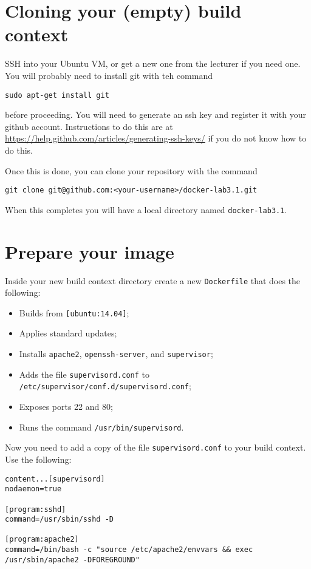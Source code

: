 \documentclass{article}
\begin{document}
\section{Cloning your (empty) build context}
SSH into your Ubuntu VM, or get a new one from the lecturer if you need one.  You will probably need to install git with teh command

\texttt{sudo apt-get install git}

before proceeding.  You will need to generate an ssh key and register it with your github account.  Instructions to do this are at \url{https://help.github.com/articles/generating-ssh-keys/} if you do not know how to do this.

Once this is done, you can clone your repository with the command

\texttt{git clone git@github.com:<your-username>/docker-lab3.1.git}

When this completes you will have a local directory named \texttt{docker-lab3.1}.

\section{Prepare your image}
Inside your new build context directory create a new \texttt{Dockerfile} that does the following:

\begin{itemize}
	\item Builds from \texttt{[ubuntu:14.04]};
	\item Applies standard updates;
	\item Installs \texttt{apache2}, \texttt{openssh-server}, and \texttt{supervisor};
	\item Adds the file \texttt{supervisord.conf} to \texttt{/etc/supervisor/conf.d/supervisord.conf};
	\item Exposes ports 22 and 80;
	\item Runs the command \texttt{/usr/bin/supervisord}.
	
	
	
\end{itemize}

Now you need to add a copy of the file \texttt{supervisord.conf} to your build context.  Use the following:

\begin{verbatim}
content...[supervisord]
nodaemon=true

[program:sshd]
command=/usr/sbin/sshd -D

[program:apache2]
command=/bin/bash -c "source /etc/apache2/envvars && exec /usr/sbin/apache2 -DFOREGROUND"

\end{verbatim}
\end{document}
